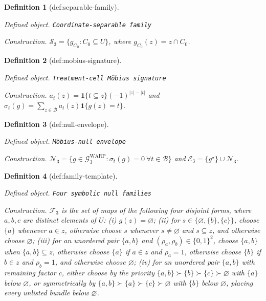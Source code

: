 \documentclass{article}
\newtheorem{definition}{Definition}
\begin{document}
\begin{definition}[def:separable-family]\label{def:separable-family}
\par\smallskip\noindent\emph{Defined object.} \texttt{Coordinate-\allowbreak{}separable family}
\par\smallskip\noindent\emph{Construction.} \(\mathcal S_3=\{g_{C_0}:C_0\subseteq U\}\), where \(g_{C_0}(z)=z\cap C_0\).
\end{definition}

\begin{definition}[def:mobius-signature]\label{def:mobius-signature}
\par\smallskip\noindent\emph{Defined object.} \texttt{Treatment-\allowbreak{}cell Möbius signature}
\par\smallskip\noindent\emph{Construction.} \(a_t(z)=\mathbf 1\{t\subseteq z\}(-1)^{|z|-|t|}\) and \(\sigma_t(g)=\sum_{z\in\mathcal B}a_t(z)\mathbf 1\{g(z)=t\}\).
\end{definition}

\begin{definition}[def:null-envelope]\label{def:null-envelope}
\par\smallskip\noindent\emph{Defined object.} \texttt{Möbius-\allowbreak{}null envelope}
\par\smallskip\noindent\emph{Construction.} \(\mathcal N_3=\{g\in\mathcal G^{\mathrm{WARP}}_3:\sigma_t(g)=0\ \forall t\in\mathcal B\}\) and \(\mathcal E_3=\{g^\star\}\cup\mathcal N_3\).
\end{definition}

\begin{definition}[def:family-template]\label{def:family-template}
\par\smallskip\noindent\emph{Defined object.} \texttt{Four symbolic null families}
\par\smallskip\noindent\emph{Construction.} \(\mathcal F_3\) is the set of maps of the following four disjoint forms, where \(a,b,c\) are distinct elements of \(U\): (i) \(g(z)=\varnothing\); (ii) for \(s\in\{\varnothing,\{b\},\{c\}\}\), choose \(\{a\}\) whenever \(a\in z\), otherwise choose \(s\) whenever \(s\ne\varnothing\) and \(s\subseteq z\), and otherwise choose \(\varnothing\); (iii) for an unordered pair \(\{a,b\}\) and \((\rho_a,\rho_b)\in\{0,1\}^2\), choose \(\{a,b\}\) when \(\{a,b\}\subseteq z\), otherwise choose \(\{a\}\) if \(a\in z\) and \(\rho_a=1\), otherwise choose \(\{b\}\) if \(b\in z\) and \(\rho_b=1\), and otherwise choose \(\varnothing\); (iv) for an unordered pair \(\{a,b\}\) with remaining factor \(c\), either choose by the priority \(\{a,b\}\succ\{b\}\succ\{c\}\succ\varnothing\) with \(\{a\}\) below \(\varnothing\), or symmetrically by \(\{a,b\}\succ\{a\}\succ\{c\}\succ\varnothing\) with \(\{b\}\) below \(\varnothing\), placing every unlisted bundle below \(\varnothing\).
\end{definition}
\end{document}
